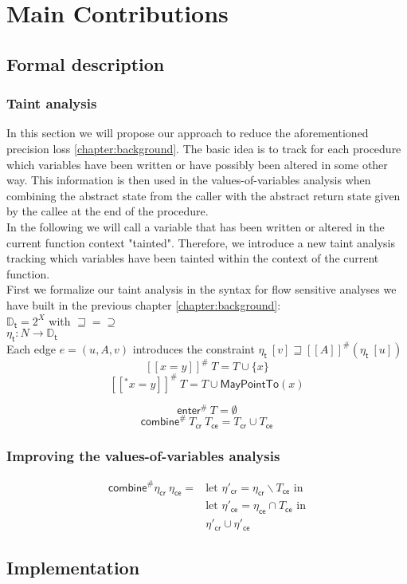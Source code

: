 
\chapter{Main Contributions}\label{chapter:mainContributions}

  \section{Formal description}
    \subsection{Taint analysis}
      In this section we will propose our approach to reduce the aforementioned precision loss \ref{chapter:background}. The basic idea is to track for each procedure which variables have been written or have possibly been altered in some other way. This information is then used in the values-of-variables analysis when combining the abstract state from the caller with the abstract return state given by the callee at the end of the procedure.\\
      In the following we will call a variable that has been written or altered in the current function context "tainted". Therefore, we introduce a new taint analysis tracking which variables have been tainted within the context of the current function.\\
      First we formalize our taint analysis in the syntax for flow sensitive analyses we have built in the previous chapter \ref{chapter:background}:\\
      $\mathbb{D}_\textsf{t} = 2^X$ with $\sqsupseteq = \supseteq$\\
      $\eta_\textsf{t}: N \rightarrow \mathbb{D}_\textsf{t}$\\
      Each edge $e = (u, A, v)$ introduces the constraint $\eta_\textsf{t}\ [v] \sqsupseteq [\![  A ]\!] ^{\#}  (\eta_\textsf{t}\ [u]) $\\
      \[ [\![ x = y ]\!] ^{\#}\ T =  T \cup \{x\} \]
      \[ [\![ ^*x = y ]\!] ^{\#}\ T =  T \cup \textsf{MayPointTo}(x) \]
      
      \[ \textsf{enter}^{\#}\ T = \emptyset\]
      \[ \textsf{combine}^{\#}\ T_\textsf{cr}\ T_\textsf{ce} = T_\textsf{cr} \cup T_\textsf{ce} \]

    \subsection{Improving the values-of-variables analysis}
      \begin{align}
        \textsf{combine}^{\#} \eta_\textsf{cr}\ \eta_\textsf{ce} = & \text{let } \eta'_\textsf{cr} = \eta_\textsf{cr} \backslash T_\textsf{ce} \text{ in} \\
        & \text{let } \eta'_\textsf{ce} = \eta_\textsf{ce} \cap T_\textsf{ce} \text{ in} \\
        & \eta'_\textsf{cr} \cup \eta'_\textsf{ce}
      \end{align}

  \section{Implementation}



